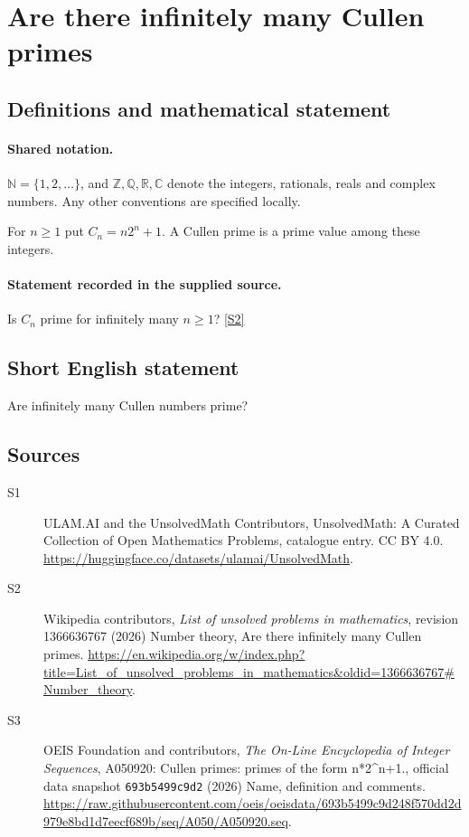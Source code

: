 \documentclass[11pt]{article}
\newcommand{\sref}[2]{\hyperlink{source:#1:#2}{[S#2]}}
\begin{document}
\section{Are there infinitely many Cullen primes}\label{statement}

\subsection{Definitions and mathematical statement}

\paragraph{Shared notation.}$\mathbb N=\{1,2,\ldots\}$, and $\mathbb Z,\mathbb Q,\mathbb R,\mathbb C$ denote the integers, rationals, reals and complex numbers. Any other conventions are specified locally.


For $n\ge1$ put $C_n=n2^n+1$. A Cullen prime is a prime value among these integers.
\paragraph{Statement recorded in the supplied source.}
Is $C_n$ prime for infinitely many $n\ge1$? \sref{statement}{2}
\subsection{Short English statement}
Are infinitely many Cullen numbers prime?
\subsection{Sources}
\begin{description}
\item[\hypertarget{source:statement:1}{S1}] ULAM.AI and the UnsolvedMath Contributors, UnsolvedMath: A Curated Collection of Open Mathematics Problems, catalogue entry. CC BY 4.0. \url{https://huggingface.co/datasets/ulamai/UnsolvedMath}.
\item[\hypertarget{source:statement:2}{S2}] Wikipedia contributors, \emph{List of unsolved problems in mathematics}, revision 1366636767 (2026) Number theory, Are there infinitely many Cullen primes. \url{https://en.wikipedia.org/w/index.php?title=List_of_unsolved_problems_in_mathematics&oldid=1366636767#Number_theory}.
\item[\hypertarget{source:statement:3}{S3}] OEIS Foundation and contributors, \emph{The On-Line Encyclopedia of Integer Sequences}, A050920: Cullen primes: primes of the form n*2\textasciicircum{}n+1., official data snapshot \texttt{693b5499c9d2} (2026) Name, definition and comments. \url{https://raw.githubusercontent.com/oeis/oeisdata/693b5499c9d248f570dd2d979e8bd1d7eecf689b/seq/A050/A050920.seq}.
\end{description}
\label{end:statement}
\end{document}
